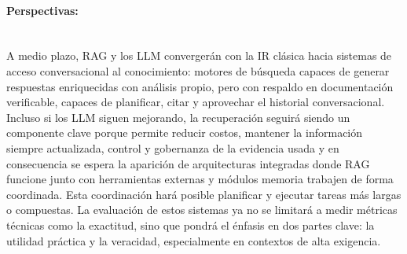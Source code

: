\paragraph{Perspectivas:} 
\mbox{}\\
A medio plazo, RAG y los LLM convergerán con la IR clásica hacia sistemas de acceso conversacional al conocimiento: motores de búsqueda capaces de generar respuestas enriquecidas con análisis propio,
pero con respaldo en documentación verificable, capaces de planificar, citar y aprovechar el historial conversacional. Incluso si los LLM siguen mejorando, la recuperación seguirá 
siendo un componente clave porque permite reducir costos, mantener la información siempre actualizada, control y gobernanza de la evidencia usada y en consecuencia se espera la aparición de arquitecturas integradas donde RAG funcione junto con
herramientas externas y módulos memoria trabajen de forma coordinada. Esta coordinación hará posible planificar y ejecutar tareas más largas o compuestas. La evaluación de estos sistemas ya no se limitará a medir métricas técnicas como la exactitud, sino que pondrá el énfasis en
 dos partes clave: la utilidad práctica y la veracidad, especialmente en contextos de alta exigencia.


